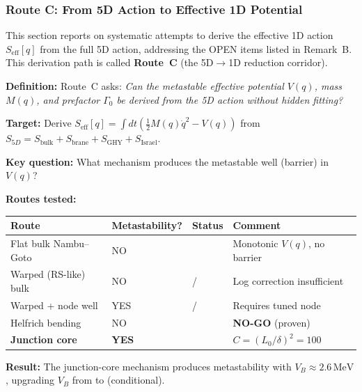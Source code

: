 
\subsubsection{Route C: From 5D Action to Effective 1D Potential}
\label{subsec:routeC_corridor}

This section reports on systematic attempts to derive the effective 1D action
$S_{\mathrm{eff}}[q]$ from the full 5D action, addressing the OPEN items listed in
Remark~B. This derivation path is called \textbf{Route~C} (the 5D$\to$1D reduction corridor).

\textbf{Definition:} Route~C asks: \emph{Can the metastable effective potential $V(q)$,
mass $M(q)$, and prefactor $\Gamma_0$ be derived from the 5D action without hidden fitting?}

\begin{tcolorbox}[colback=green!5!white, colframe=green!50!black,
                  title={\textbf{Route C: Executive Summary}}]
\textbf{Target:} Derive $S_{\mathrm{eff}}[q] = \int dt \left( \frac{1}{2}M(q)\dot{q}^2 - V(q) \right)$
from $S_{5D} = S_{\mathrm{bulk}} + S_{\mathrm{brane}} + S_{\mathrm{GHY}} + S_{\mathrm{Israel}}$.

\textbf{Key question:} What mechanism produces the metastable well (barrier) in $V(q)$?

\textbf{Routes tested:}
\begin{center}
\begin{tabular}{llll}
\toprule
\textbf{Route} & \textbf{Metastability?} & \textbf{Status} & \textbf{Comment} \\
\midrule
Flat bulk Nambu--Goto & NO & \tagDc{} & Monotonic $V(q)$, no barrier \\
Warped (RS-like) bulk & NO & \tagDc{}/\tagP{} & Log correction insufficient \\
Warped + node well & YES & \tagP{}/\tagCal{} & Requires tuned node \\
Helfrich bending & NO & \tagDc{} & \textbf{NO-GO} (proven) \\
\textbf{Junction core} & \textbf{YES} & \tagDc{} & $C = (L_0/\delta)^2 = 100$ \\
\bottomrule
\end{tabular}
\end{center}

\textbf{Result:} The junction-core mechanism produces metastability with
$V_B \approx 2.6\,\mathrm{MeV}$, upgrading $V_B$ from \tagCal{} to \tagDc{} (conditional).
\end{tcolorbox}

